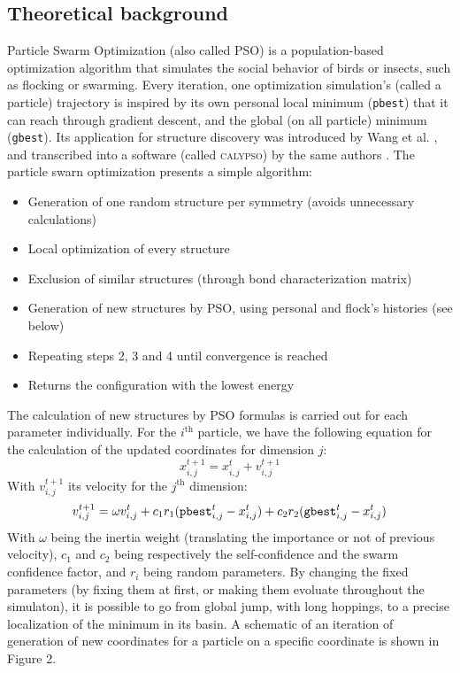 \documentclass[11pt]{article}
\begin{document}
\begin{multicols}{2}
\subsection*{Theoretical background}
Particle Swarm Optimization (also called PSO) is a population-based optimization algorithm that simulates the social behavior of birds or insects, such as flocking or swarming. Every iteration, one optimization simulation's (called a particle) trajectory is inspired by its own personal local minimum (\verb+pbest+) that it can reach through gradient descent, and the global (on all particle) minimum (\verb+gbest+). Its application for structure discovery was introduced by Wang et al. \cite{PhysRevB.82.094116}, and transcribed into a software (called \textsc{calypso}) by the same authors \cite{WANG20122063}. The particle swarn optimization presents a simple algorithm:
\begin{itemize}
\itemsep0em
    \item Generation of one random structure per symmetry (avoids unnecessary calculations)
    \item Local optimization of every structure
    \item Exclusion of similar structures (through bond characterization matrix)
    \item Generation of new structures by PSO, using personal and flock's histories (see below)
    \item Repeating steps 2, 3 and 4 until convergence is reached
    \item Returns the configuration with the lowest energy
\end{itemize}
The calculation of new structures by PSO formulas is carried out for each parameter individually.
For the $i^\text{th}$ particle, we have the following equation for the calculation of the updated coordinates for dimension $j$:
\begin{equation}
    x_{i,j}^{t+1}=x_{i,j}^{t}+v_{i,j}^{t+1}
\end{equation}
With $v_{i,j}^{t+1}$ its velocity for the $j^\text{th}$ dimension:
\begin{equation}
    v_{i,j}^{t+1}=\omega v_{i,j}^t+c_1r_1(\verb+pbest+_{i,j}^t-x_{i,j}^t)+c_2r_2(\verb+gbest+_{i,j}^t-x_{i,j}^t)
\end{equation}
With $\omega$ being the inertia weight (translating the importance or not of previous velocity), $c_1$ and $c_2$ being respectively the self-confidence and the swarm confidence factor, and $r_i$ being random parameters. By changing the fixed parameters (by fixing them at first, or making them evoluate throughout the simulaton), it is possible to go from global jump, with long hoppings, to a precise localization of the minimum in its basin.
A schematic of an iteration of generation of new coordinates for a particle on a specific coordinate is shown in Figure 2. 
\bigskip


\end{multicols}
\end{document}
